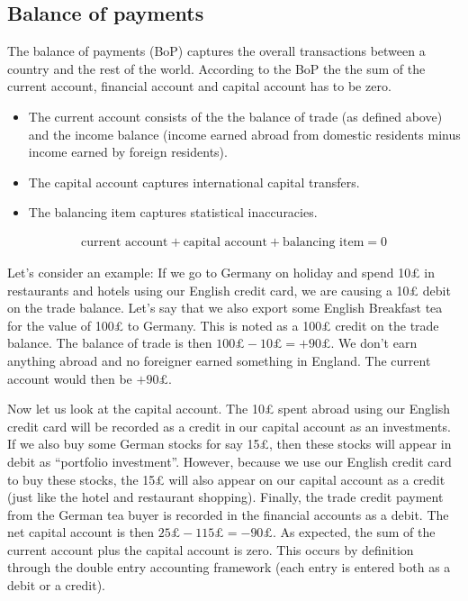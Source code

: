 \documentclass[]{book}
\providecommand{\tightlist}{%
  \setlength{\itemsep}{0pt}\setlength{\parskip}{0pt}}
\begin{document}
\hypertarget{balance-of-payments}{%
\subsection{Balance of payments}\label{balance-of-payments}}

The balance of payments (BoP) captures the overall transactions between a country and the rest of the world. According to the BoP the the sum of the current account, financial account and capital account has to be zero.

\begin{itemize}
\tightlist
\item
  The current account consists of the the balance of trade (as defined above) and the income balance (income earned abroad from domestic residents minus income earned by foreign residents).
\item
  The capital account captures international capital transfers.
\item
  The balancing item captures statistical inaccuracies.
\end{itemize}

\begin{align}
  \text{current account}+\text{capital account}+\text{balancing item}=0 
\end{align}

Let's consider an example: If we go to Germany on holiday and spend 10£ in restaurants and hotels using our English credit card, we are causing a 10£ debit on the trade balance. Let's say that we also export some English Breakfast tea for the value of 100£ to Germany. This is noted as a 100£ credit on the trade balance. The balance of trade is then \(100£-10£=+90£\). We don't earn anything abroad and no foreigner earned something in England. The current account would then be \(+90£\).

Now let us look at the capital account. The 10£ spent abroad using our English credit card will be recorded as a credit in our capital account as an investments. If we also buy some German stocks for say 15£, then these stocks will appear in debit as ``portfolio investment''. However, because we use our English credit card to buy these stocks, the 15£ will also appear on our capital account as a credit (just like the hotel and restaurant shopping). Finally, the trade credit payment from the German tea buyer is recorded in the financial accounts as a debit. The net capital account is then \(25£-115£=-90£\). As expected, the sum of the current account plus the capital account is zero. This occurs by definition through the double entry accounting framework (each entry is entered both as a debit or a credit).
\end{document}
